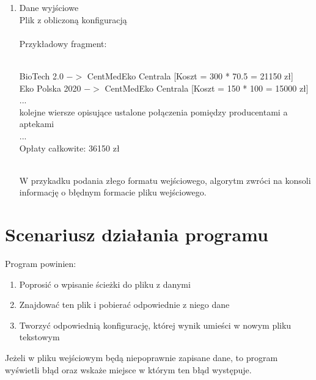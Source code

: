 \documentclass{article}
\begin{document}
\begin{enumerate}
    \item Dane wyjściowe
    \\Plik z obliczoną konfiguracją
    \\
    \\Przykładowy fragment:
    \begin{tcolorbox}
    \\BioTech 2.0 $->$ CentMedEko Centrala [Koszt = 300 * 70.5 = 21150 zł]
    \\Eko Polska 2020 $->$ CentMedEko Centrala [Koszt = 150 * 100 = 15000 zł]
    \\...
    \\kolejne wiersze opisujące ustalone połączenia pomiędzy producentami a aptekami
    \\...
    \\Opłaty całkowite: 36150 zł
    \end{tcolorbox}
    \\W przykadku podania złego formatu wejściowego, algorytm zwróci na konsoli informację o błędnym formacie pliku wejściowego.
    
\end{enumerate}

\section{Scenariusz działania programu}
Program powinien:
\begin{enumerate}
    \item Poprosić o wpisanie ścieżki do pliku z danymi
    \item Znajdować ten plik i pobierać odpowiednie z niego dane
    \item Tworzyć odpowiednią konfigurację, której wynik umieści w nowym pliku tekstowym
\end{enumerate}
Jeżeli w pliku wejściowym będą niepoprawnie zapisane dane, to program wyświetli błąd oraz wskaże miejsce w którym ten błąd występuje.
\end{document}
